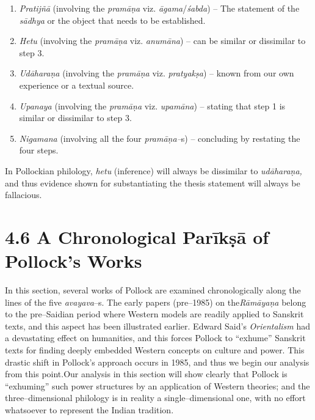 \begin{enumerate}
\item \textit{Pratijñā} (involving the \textit{pramāṇa }viz.\textit{ āgama}/\textit{śabda}) – The statement of the \textit{sādhya }or the object that needs to be established.

 \item \textit{Hetu} (involving the \textit{pramāṇa }viz.\textit{ anumāna}) – can be similar or dissimilar to step 3.

 \item \textit{Udāharaṇa} (involving the \textit{pramāṇa }viz.\textit{ pratyakṣa}) – known from our own experience or a textual source.

 \item \textit{Upanaya} (involving the \textit{pramāṇa }viz.\textit{ upamāna}) – stating that step 1 is similar or dissimilar to step 3.

 \item \textit{Nigamana} (involving all the four \textit{pramāṇa–}s) – concluding by restating the four steps.

\end{enumerate}

In Pollockian philology, \textit{hetu} (inference) will always be dissimilar to \textit{udāharaṇa,} and thus evidence shown for substantiating the thesis statement will always be fallacious.


\section*{4.6 A Chronological Parīkṣā of Pollock’s Works}

In this section, several works of Pollock are examined chronologically along the lines of the five \textit{avayava}–s. The early papers (pre–1985) on the\textit{Rāmāyaṇa} belong to the pre–Saidian period where Western models are readily applied to Sanskrit texts, and this aspect has been illustrated earlier. Edward Said’s \textit{Orientalism }had a devastating effect on humanities, and this forces Pollock to “exhume” Sanskrit texts for finding deeply embedded Western concepts on culture and power. This drastic shift in Pollock’s approach occurs in 1985, and thus we begin our analysis from this point.Our analysis in this section will show clearly that Pollock is “exhuming” such power structures by an application of Western theories; and the three–dimensional philology is in reality a single–dimensional one, with no effort whatsoever to represent the Indian tradition.

